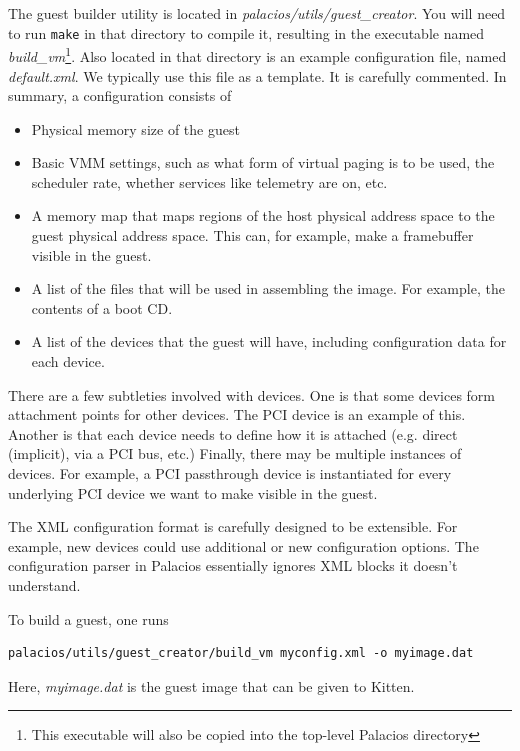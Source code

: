 \documentclass[11pt]{article}
\begin{document}
The guest builder utility is located in {\em
palacios/utils/guest\_creator}.  You will need to run \verb.make. in
that directory to compile it, resulting in the executable named {\em
build\_vm}\footnote{This executable will also be copied into the top-level
Palacios directory}.  Also located in that directory is an example
configuration file, named {\em default.xml}.  We typically use this
file as a template.  It is carefully commented.  In summary, a
configuration consists of
\begin{itemize}
\item Physical memory size of the guest
\item Basic VMM settings, such as what form of virtual paging is to be
used, the scheduler rate, whether services like telemetry are on, etc.
\item A memory map that maps regions of the host physical address
space to the guest physical address space.  This can, for example,
make a framebuffer visible in the guest.
\item A list of the files that will be used in assembling the image.
For example, the contents of a boot CD.
\item A list of the devices that the guest will have, including
configuration data for each device.
\end{itemize}
There are a few subtleties involved with devices.  One is that some
devices form attachment points for other devices.  The PCI device is
an example of this.  Another is that each device needs to define how
it is attached (e.g. direct (implicit), via a PCI bus, etc.)
Finally, there may be multiple instances of devices.   For example, a
PCI passthrough device is instantiated for every underlying PCI device
we want to make visible in the guest. 

The XML configuration format is carefully designed to be extensible.
For example, new devices could use additional or new configuration
options.  The configuration parser in Palacios essentially ignores XML
blocks it doesn't understand. 


To build a guest, one runs
\begin{verbatim}
palacios/utils/guest_creator/build_vm myconfig.xml -o myimage.dat
\end{verbatim}
Here, {\em myimage.dat} is the guest image that can be given to
Kitten. 
\end{document}
